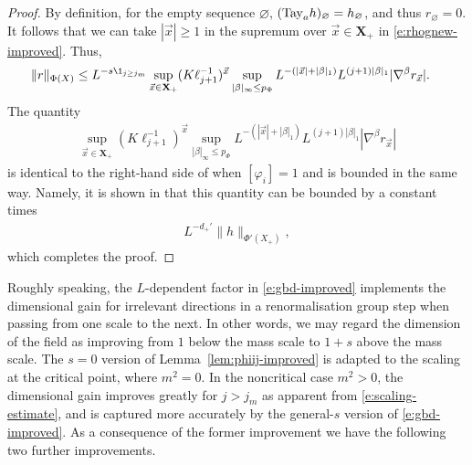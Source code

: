 \begin{proof}
By definition, for the empty sequence $\varnothing$, $({\rm Tay}_a h)_\varnothing = h_\varnothing$,
and thus $r_\varnothing = 0$.
It follows that we can take $|\vec x| \geq 1$ in the supremum over ${\vec x} \in \mathbf{X}_+$ in
\eqref{e:rhognew-improved}. Thus,
\begin{align}
    \|r\|_{\Phi (X)}
    & \le
    L^{-s \1_{{j\geq j_m}}}
    \sup_{{\vec x} \in {\mathbf X}_+}
    (K\ell_{j+1}^{-1})^{\vec x}
    \sup_{|\beta|_\infty \le p_\Phi}
    L^{-(|\vec x| +|\beta|_1)}
    L^{(j+1) |\beta|_1}
    | \nabla^\beta  r_{{\vec x}}  |.
\end{align}
The quantity
\begin{align}
\label{e:rhognew}
    \sup_{{\vec x} \in {\mathbf X}_+}
    (K\ell_{j+1}^{-1})^{\vec x}
    \sup_{|\beta|_\infty \le p_\Phi}
    L^{-(|\vec x| +|\beta|_1)}
    L^{(j+1) |\beta|_1}
    | \nabla^\beta  r_{{\vec x}}  |
\end{align}
is identical to the right-hand side of \cite[\eqref{loc-e:rhognew}]{BS-rg-loc}
when $[\varphi_i] = 1$ and is bounded in the same way. Namely, it is shown in
\cite{BS-rg-loc} that this quantity can be bounded by a constant times
\begin{align}
    L^{-d_{+}'}
    \|h\|_{\Phi'( X_+)},
\end{align}
which completes the proof.
\end{proof}

Roughly speaking, the $L$-dependent factor in \eqref{e:gbd-improved} implements the dimensional gain
for irrelevant directions in a renormalisation group step when passing from one scale to the next.
In other words, we may regard the dimension of the field as improving from $1$ below the
mass scale to $1+s$ above the mass scale.
The $s=0$ version of Lemma~\ref{lem:phiij-improved} is adapted to the scaling at the critical point, where $m^2=0$.
In the noncritical case $m^2>0$, the dimensional gain improves greatly for $j>j_m$
as apparent from \eqref{e:scaling-estimate}, and is
captured more accurately by the general-$s$ version of \eqref{e:gbd-improved}.
As a consequence of the former improvement we have the following two further improvements.

